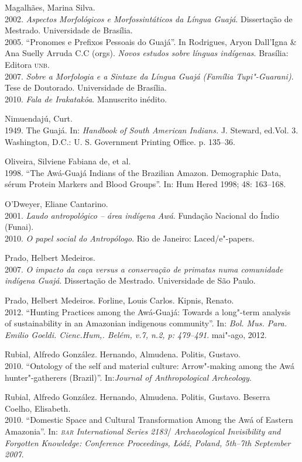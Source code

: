 \begin{bibliohedra}
Magalhães, Marina Silva.\\
2002. \emph{Aspectos Morfológicos e
Morfossintáticos da Língua Guajá}. Dissertação de Mestrado. Universidade
de Brasília.\\
2005. ``Pronomes e Prefixos Pessoais do
Guajá''. In Rodrigues, Aryon Dall'Igna \& Ana Suelly Arruda C.C (orgs).
\emph{Novos estudos sobre línguas indígenas}. Brasília: Editora \textsc{unb}.\\
2007. \emph{Sobre a Morfologia e a Sintaxe da
Língua Guajá (Família Tupi"-Guarani)}. Tese de Doutorado. Universidade de
Brasília.\\
2010. \emph{Fala de Irakatakôa}. Manuscrito
inédito.

Nimuendajú, Curt.\\
1949. The Guajá. In: \emph{Handbook of South American
Indians.} J. Steward, ed.Vol. 3. Washington, D.C.: U. S. Government
Printing Office. p. 135--36.

Oliveira, Silviene Fabiana de, et al.\\
1998. ``The Awá-Guajá Indians of
the Brazilian Amazon. Demographic Data, sérum Protein Markers and Blood
Groups''. In: Hum Hered 1998; 48: 163--168.

O'Dweyer, Eliane Cantarino.\\
2001. \emph{Laudo antropológico -- área
indígena Awá}. Fundação Nacional do Índio (Funai).\\
2010. \emph{O papel social do Antropólogo}.
Rio de Janeiro: Laced/e"-papers.

Prado, Helbert Medeiros.\\
2007. \emph{O impacto da caça versus a conservação de
primatas numa comunidade indígena Guajá}. Dissertação de Mestrado.
Universidade de São Paulo.

Prado, Helbert Medeiros. Forline, Louis Carlos. Kipnis, Renato.\\
2012. ``Hunting Practices among the Awá-Guajá: Towards a long"-term analysis of
sustainability in an Amazonian indigenous community''. In: \emph{Bol. Mus.
Para. Emilio Goeldi. Cienc.Hum,. Belém, v.7, n.2, p: 479--491}. mai"-ago,
2012.

Rubial, Alfredo González. Hernando, Almudena. Politis, Gustavo.\\
2010. ``Ontology of the self and material culture: Arrow"-making among the Awá
hunter"-gatherers (Brazil)''. In:\emph{Journal of Anthropological
Archeology}.

Rubial, Alfredo González. Hernando, Almudena. Politis, Gustavo.
Beserra Coelho, Elisabeth.\\
2010. ``Domestic Space and Cultural Transformation
Among the Awá of Eastern Amazonia''. In: \emph{\textsc{bar} International Series
2183}/ \emph{Archaeological Invisibility and Forgotten Knowledge:
Conference Proceedings, Łódź, Poland, 5th--7th September 2007}.


\end{bibliohedra}
